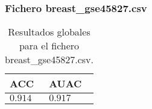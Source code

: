 \clearpage


\subsubsection{Fichero breast\_gse45827.csv}

\begin{table}[htp]
    \small
    \centering
    \begin{tabularx}{\columnwidth}{Y Y}
        ACC       & AUAC    \\\hline
        $0.914$   & $0.917$ \\\hline
    \end{tabularx}
    \caption{Resultados globales para el fichero breast\_gse45827.csv.}
    \label{tab:12}
\end{table}

